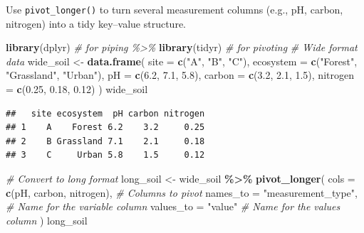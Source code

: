 \documentclass[
  10pt,
  b5paper,
  oneside]{book}
\newenvironment{Shaded}{\begin{snugshade}}{\end{snugshade}}
\newcommand{\AttributeTok}[1]{\textcolor[rgb]{0.13,0.29,0.53}{#1}}
\newcommand{\CommentTok}[1]{\textcolor[rgb]{0.56,0.35,0.01}{\textit{#1}}}
\newcommand{\FloatTok}[1]{\textcolor[rgb]{0.00,0.00,0.81}{#1}}
\newcommand{\FunctionTok}[1]{\textcolor[rgb]{0.13,0.29,0.53}{\textbf{#1}}}
\newcommand{\NormalTok}[1]{#1}
\newcommand{\OtherTok}[1]{\textcolor[rgb]{0.56,0.35,0.01}{#1}}
\newcommand{\SpecialCharTok}[1]{\textcolor[rgb]{0.81,0.36,0.00}{\textbf{#1}}}
\newcommand{\StringTok}[1]{\textcolor[rgb]{0.31,0.60,0.02}{#1}}
\begin{document}
Use \texttt{pivot\_longer()} to turn several measurement columns (e.g., pH, carbon, nitrogen) into a tidy key--value structure.

\begin{Shaded}
\begin{Highlighting}[]
\FunctionTok{library}\NormalTok{(dplyr) }\CommentTok{\# for piping \%\textgreater{}\%}
\FunctionTok{library}\NormalTok{(tidyr) }\CommentTok{\# for pivoting}
\CommentTok{\# Wide format data}
\NormalTok{wide\_soil }\OtherTok{\textless{}{-}} \FunctionTok{data.frame}\NormalTok{(}
 \AttributeTok{site =} \FunctionTok{c}\NormalTok{(}\StringTok{"A"}\NormalTok{, }\StringTok{"B"}\NormalTok{, }\StringTok{"C"}\NormalTok{),}
 \AttributeTok{ecosystem =} \FunctionTok{c}\NormalTok{(}\StringTok{"Forest"}\NormalTok{, }\StringTok{"Grassland"}\NormalTok{, }\StringTok{"Urban"}\NormalTok{),}
 \AttributeTok{pH =} \FunctionTok{c}\NormalTok{(}\FloatTok{6.2}\NormalTok{, }\FloatTok{7.1}\NormalTok{, }\FloatTok{5.8}\NormalTok{),}
 \AttributeTok{carbon =} \FunctionTok{c}\NormalTok{(}\FloatTok{3.2}\NormalTok{, }\FloatTok{2.1}\NormalTok{, }\FloatTok{1.5}\NormalTok{),}
 \AttributeTok{nitrogen =} \FunctionTok{c}\NormalTok{(}\FloatTok{0.25}\NormalTok{, }\FloatTok{0.18}\NormalTok{, }\FloatTok{0.12}\NormalTok{)}
\NormalTok{)}
\NormalTok{wide\_soil}
\end{Highlighting}
\end{Shaded}

\begin{verbatim}
##   site ecosystem  pH carbon nitrogen
## 1    A    Forest 6.2    3.2     0.25
## 2    B Grassland 7.1    2.1     0.18
## 3    C     Urban 5.8    1.5     0.12
\end{verbatim}

\begin{Shaded}
\begin{Highlighting}[]
\CommentTok{\# Convert to long format}
\NormalTok{long\_soil }\OtherTok{\textless{}{-}}\NormalTok{ wide\_soil }\SpecialCharTok{\%\textgreater{}\%}
 \FunctionTok{pivot\_longer}\NormalTok{(}
  \AttributeTok{cols =} \FunctionTok{c}\NormalTok{(pH, carbon, nitrogen),     }\CommentTok{\# Columns to pivot}
  \AttributeTok{names\_to =} \StringTok{"measurement\_type"}\NormalTok{,      }\CommentTok{\# Name for the variable column}
  \AttributeTok{values\_to =} \StringTok{"value"}           \CommentTok{\# Name for the values column}
\NormalTok{ )}
\NormalTok{long\_soil}
\end{Highlighting}
\end{Shaded}
\end{document}
